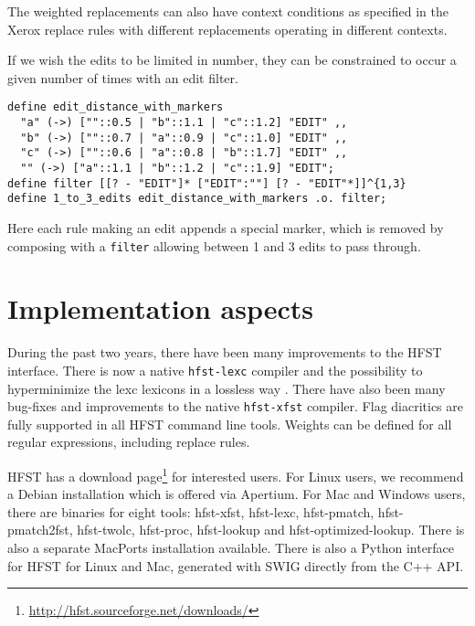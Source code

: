 \documentclass{llncs}
\begin{document}
\noindent The weighted replacements can also have context conditions as specified 
in the Xerox replace rules \cite{drobac/2012} 
with different replacements operating in different contexts.

If we wish the edits to be limited in number, they can be constrained to occur a given number of times with an edit
filter.

\begin{center}
\begin{framed}
\begin{verbatim}
define edit_distance_with_markers
  "a" (->) [""::0.5 | "b"::1.1 | "c"::1.2] "EDIT" ,,
  "b" (->) [""::0.7 | "a"::0.9 | "c"::1.0] "EDIT" ,,
  "c" (->) [""::0.6 | "a"::0.8 | "b"::1.7] "EDIT" ,,
  "" (->) ["a"::1.1 | "b"::1.2 | "c"::1.9] "EDIT";
define filter [[? - "EDIT"]* ["EDIT":""] [? - "EDIT"*]]^{1,3}
define 1_to_3_edits edit_distance_with_markers .o. filter;
\end{verbatim}
\end{framed}
\end{center}

\noindent Here each rule making an edit appends a special marker, which is removed
by composing with a \verb+filter+ allowing between 1 and 3
edits to pass through.

\section{Implementation aspects}\label{sec:background}
During the past two years, there have been many improvements to the HFST 
interface. There is now a native {\tt hfst-lexc} compiler and the possibility to 
hyperminimize the lexc lexicons in a lossless way \cite{drobac/2014}. There have also been many bug-fixes and 
improvements to the native {\tt hfst-xfst} compiler. Flag diacritics are fully supported 
in all HFST command line tools. Weights can be defined for all regular expressions,
including replace rules.

HFST has a download page\footnote{\url{http://hfst.sourceforge.net/downloads/}} for interested users. 
For Linux users, we recommend a Debian installation
which is offered via Apertium. For Mac and Windows users,
there are binaries for eight tools: hfst-xfst, hfst-lexc, hfst-pmatch,
hfst-pmatch2fst, hfst-twolc, hfst-proc, hfst-lookup and hfst-optimized-lookup.
There is also a separate MacPorts installation available. 
There is also a Python interface for HFST for Linux and Mac, generated with SWIG directly
from the C++ API. 
\end{document}
